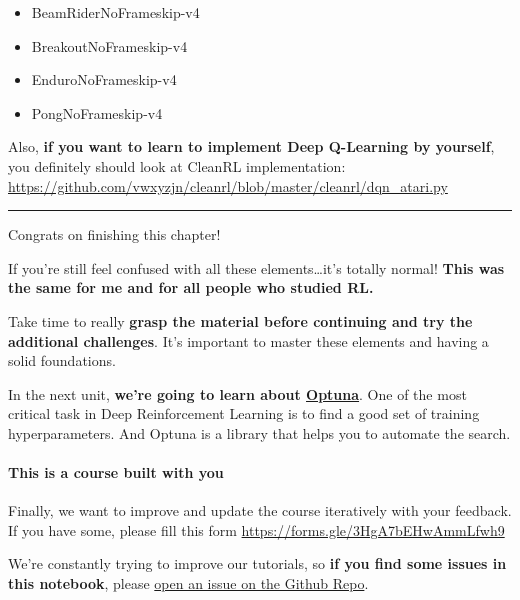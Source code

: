 \documentclass[11pt,a4paper]{article}
\begin{document}
\begin{itemize}
\tightlist
\item
  BeamRiderNoFrameskip-v4
\item
  BreakoutNoFrameskip-v4
\item
  EnduroNoFrameskip-v4
\item
  PongNoFrameskip-v4
\end{itemize}

Also, \textbf{if you want to learn to implement Deep Q-Learning by yourself}, you definitely should look at CleanRL implementation: \url{https://github.com/vwxyzjn/cleanrl/blob/master/cleanrl/dqn_atari.py}


\begin{center}\rule{0.5\linewidth}{0.5pt}\end{center}

Congrats on finishing this chapter!

If you're still feel confused with all these elements\ldots it's totally normal! \textbf{This was the same for me and for all people who studied RL.}

Take time to really \textbf{grasp the material before continuing and try the additional challenges}. It's important to master these elements and having a solid foundations.

In the next unit, \textbf{we're going to learn about \href{https://optuna.org/}{Optuna}}. One of the most critical task in Deep Reinforcement Learning is to find a good set of training hyperparameters. And Optuna is a library that helps you to automate the search.

\paragraph{This is a course built with you}\label{this-is-a-course-built-with-you}

Finally, we want to improve and update the course iteratively with your feedback. If you have some, please fill this form \url{https://forms.gle/3HgA7bEHwAmmLfwh9}

We're constantly trying to improve our tutorials, so \textbf{if you find some issues in this notebook}, please \href{https://github.com/huggingface/deep-rl-class/issues}{open an issue on the Github Repo}.
\end{document}
